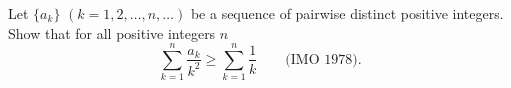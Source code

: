 Let $\{a_k\}$ $(k = 1, 2, \ldots, n, \ldots)$ be a sequence of pairwise distinct positive integers. Show that for all positive integers $n$
\[ \sum_{k=1}^n \frac{a_k}{k^2} \geq \sum_{k=1}^n \frac{1}{k} \qquad \text{(IMO 1978).} \]
